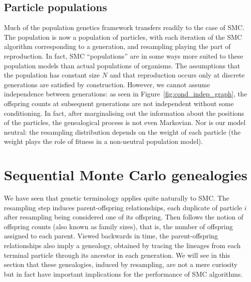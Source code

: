 \subsection{Particle populations}
Much of the population genetics framework transfers readily to the case of SMC. The population is now a population of particles, with each iteration of the SMC algorithm corresponding to a generation, and resampling playing the part of reproduction.
In fact, SMC ``populations'' are in some ways more suited to these population models than actual populations of organisms.
The assumptions that the population has constant size $N$ and that reproduction occurs only at discrete generations are satisfied by construction.
However, we cannot assume independence between generations: as seen in Figure~\ref{fig:cond_indep_graph}, the offspring counts at subsequent generations are not independent without some conditioning. In fact, after marginalising out the information about the positions of the particles, the genealogical process is not even Markovian.
Nor is our model neutral: the resampling distribution depends on the weight of each particle (the weight plays the role of fitness in a non-neutral population model).






\section{Sequential Monte Carlo genealogies}
\label{sec:SMC_genealogies}
We have seen that genetic terminology applies quite naturally to SMC.
The resampling step induces parent-offspring relationships, each duplicate of particle $i$ after resampling being considered one of its offspring. Then follows the notion of offspring counts (also known as family sizes), that is, the number of offspring assigned to each parent.
Viewed backwards in time, the parent-offspring relationships also imply a genealogy, obtained by tracing the lineages from each terminal particle through its ancestor in each generation.
We will see in this section that these genealogies, induced by resampling, are not a mere curiosity but in fact have important implications for the performance of SMC algorithms.




